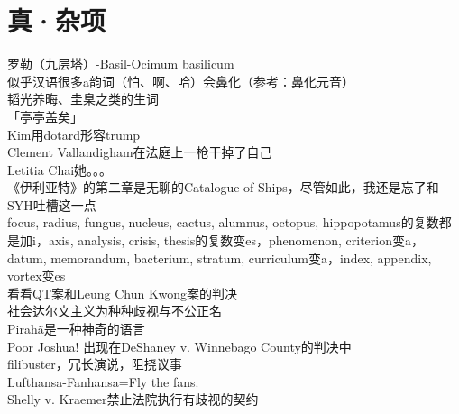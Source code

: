 \documentclass{ctexart}
\begin{document}
\section*{真·杂项}
\noindent 罗勒（九层塔）-Basil-Ocimum basilicum\\
\noindent 似乎汉语很多a韵词（怕、啊、哈）会鼻化（参考：鼻化元音）\\
\noindent 韬光养晦、圭臬之类的生词\\
\noindent 「亭亭盖矣」\\
\noindent Kim用dotard形容trump\\
\noindent Clement Vallandigham在法庭上一枪干掉了自己\\
\noindent Letitia Chai她。。。\\
\noindent 《伊利亚特》的第二章是无聊的Catalogue of Ships，尽管如此，我还是忘了和SYH吐槽这一点\\
\noindent focus, radius, fungus, nucleus, cactus, alumnus, octopus, hippopotamus的复数都是加i，axis, analysis, crisis, thesis的复数变es，phenomenon, criterion变a，datum, memorandum, bacterium, stratum, curriculum变a，index, appendix, vortex变es\\
\noindent 看看QT案和Leung Chun Kwong案的判决\\
\noindent 社会达尔文主义为种种歧视与不公正名\\
\noindent Pirah\~{a}是一种神奇的语言\\
\noindent Poor Joshua! 出现在DeShaney v. Winnebago County的判决中\\
\noindent filibuster，冗长演说，阻挠议事\\
\noindent Lufthansa-Fanhansa=Fly the fans.\\
\noindent Shelly v. Kraemer禁止法院执行有歧视的契约\\
\\
\end{document}
